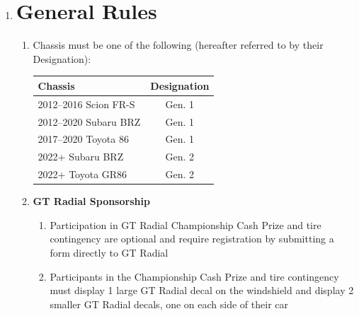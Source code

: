 \documentclass{article}
\newenvironment{legallist}{
    \begin{enumerate}[label*=\arabic*.]
}{
    \end{enumerate}
}
\begin{document}
		\begin{legallist}
						    
			\item \section*{General Rules}

			\begin{legallist}
				\item Chassis must be one of the following (hereafter referred to by their Designation):
				\begin{longtable}{l c}
					\toprule
					\textbf{Chassis}     & \textbf{Designation} \\
					\midrule 
					2012–2016 Scion FR-S & Gen. 1                          \\
					\midrule 
					2012–2020 Subaru BRZ & Gen. 1                          \\ 
					\midrule 
					2017–2020 Toyota 86  & Gen. 1                          \\
					\midrule 
					2022+ Subaru BRZ     & Gen. 2                          \\
					\midrule 
					2022+ Toyota GR86    & Gen. 2                          \\
					\bottomrule
				\end{longtable}
								
				\item \textbf{GT Radial Sponsorship}
								
				\begin{legallist}
					\item Participation in GT Radial Championship Cash Prize and tire contingency are optional and require registration by submitting a form directly to GT Radial
					\item Participants in the Championship Cash Prize and tire contingency must display 1 large GT Radial decal on the windshield and display 2 smaller GT Radial decals, one on each side of their car
				\end{legallist}
								            

\end{legallist}
\end{legallist}
\end{document}
